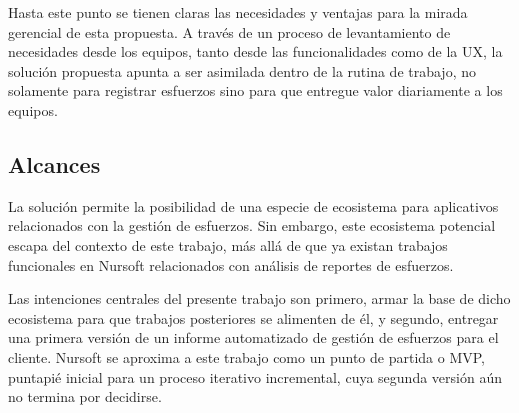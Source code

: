 \begin{itemize}
  Hasta este punto se tienen claras las necesidades y ventajas para la mirada
  gerencial de esta propuesta. A través de un proceso de levantamiento de necesidades
  desde los equipos, tanto desde las funcionalidades como de la UX\footnotemark[5], la
  solución propuesta apunta a ser asimilada dentro de la rutina de trabajo, no solamente
  para registrar esfuerzos sino para que entregue valor diariamente a los equipos.

\end{itemize}


\subsection{Alcances}

La solución permite la posibilidad de una especie de ecosistema para aplicativos
relacionados con la gestión de esfuerzos. Sin embargo, este ecosistema potencial
escapa del contexto de este trabajo, más allá de que ya existan trabajos funcionales
en Nursoft relacionados con análisis de reportes de esfuerzos.

Las intenciones centrales del presente trabajo son primero, armar la base de dicho
ecosistema para que trabajos posteriores se alimenten de él, y segundo, entregar una
primera versión de un informe automatizado de gestión de esfuerzos para el cliente.
Nursoft se aproxima a este trabajo como un punto de partida o MVP\footnotemark[6],
puntapié inicial para un proceso iterativo incremental, cuya segunda versión aún
no termina por decidirse.


